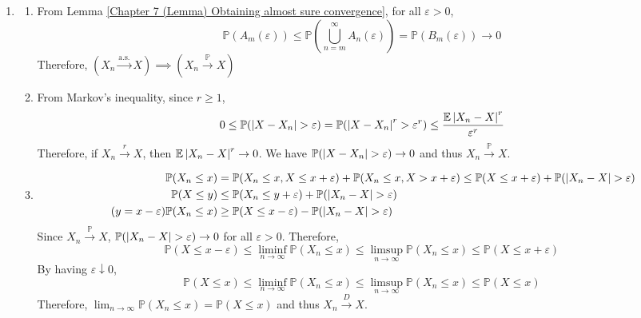 \documentclass{huhtakm-template-book}
\newcommand{\prob}{\mathbb{P}}
\newcommand{\expect}{\mathbb{E}}
\begin{document}
\begin{proofing}
	\begin{enumerate}
		\item \begin{enumerate}
			\item From Lemma \ref{Chapter 7 (Lemma) Obtaining almost sure convergence}, for all $\varepsilon>0$,
			\begin{equation*}
				\prob(A_{m}(\varepsilon))\leq\prob\left(\bigcup_{n=m}^{\infty}A_{n}(\varepsilon)\right)=\prob(B_{m}(\varepsilon))\to 0
			\end{equation*}
			Therefore, $(X_{n}\xrightarrow{\text{a.s.}}X)\implies(X_{n}\xrightarrow{\prob}X)$
			\item From Markov's inequality, since $r\geq 1$,
			\begin{equation*}
				0\leq\prob(\abs{X-X_{n}}>\varepsilon)=\prob(\abs{X-X_{n}}^{r}>\varepsilon^{r})\leq\frac{\expect\abs{X_{n}-X}^{r}}{\varepsilon^{r}}
			\end{equation*}
			Therefore, if $X_{n}\xrightarrow{r}X$, then $\expect\abs{X_{n}-X}^{r}\to 0$. We have $\prob(\abs{X-X_{n}}>\varepsilon)\to 0$ and thus $X_{n}\xrightarrow{\prob}X$.
			\item 
			\begin{align*}
				\prob(X_{n}\leq x)&=\prob(X_{n}\leq x,X\leq x+\varepsilon)+\prob(X_{n}\leq x,X>x+\varepsilon)\leq\prob(X\leq x+\varepsilon)+\prob(\abs{X_{n}-X}>\varepsilon)\\
				\prob(X\leq y)&\leq\prob(X_{n}\leq y+\varepsilon)+\prob(\abs{X_{n}-X}>\varepsilon)\\
				\tag{$y=x-\varepsilon$}
				\prob(X_{n}\leq x)
				&\geq\prob(X\leq x-\varepsilon)-\prob(\abs{X_{n}-X}>\varepsilon)
			\end{align*}
			Since $X_{n}\xrightarrow{\prob}X$, $\prob(\abs{X_{n}-X}>\varepsilon)\to 0$ for all $\varepsilon>0$. Therefore,
			\begin{equation*}
				\prob(X\leq x-\varepsilon)\leq\liminf_{n\to\infty}\prob(X_{n}\leq x)\leq\limsup_{n\to\infty}\prob(X_{n}\leq x)\leq\prob(X\leq x+\varepsilon)
			\end{equation*}
			By having $\varepsilon\downarrow 0$,
			\begin{equation*}
				\prob(X\leq x)\leq\liminf_{n\to\infty}\prob(X_{n}\leq x)\leq\limsup_{n\to\infty}\prob(X_{n}\leq x)\leq\prob(X\leq x)
			\end{equation*}
			Therefore, $\lim_{n\to\infty}\prob(X_{n}\leq x)=\prob(X\leq x)$ and thus $X_{n}\xrightarrow{D}X$.
		\end{enumerate}

\end{enumerate}
\end{proofing}
\end{document}
